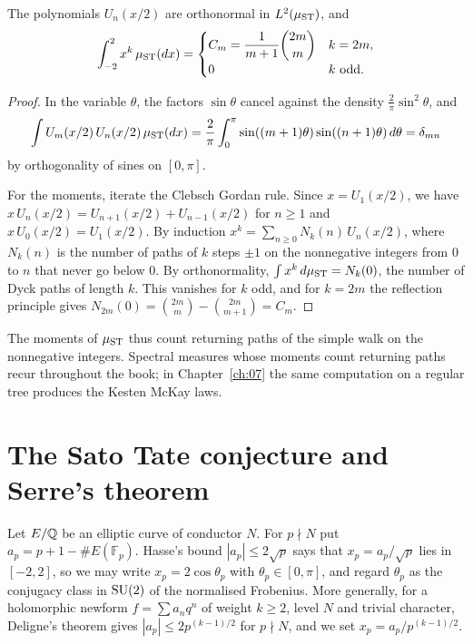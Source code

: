 \begin{proposition}\label{prop:04catalan}
The polynomials $U_n(x/2)$ are orthonormal in $L^2(\mu_{\mathrm{ST}})$, and
\[
\int_{-2}^2 x^{k}\,\mu_{\mathrm{ST}}(dx) = \begin{cases} C_m = \dfrac{1}{m+1}\dbinom{2m}{m} & k = 2m,\\[4pt] 0 & k \text{ odd.}\end{cases}
\]
\end{proposition}

\begin{proof}
In the variable $\theta$, the factors $\sin\theta$ cancel against the density $\frac{2}{\pi}\sin^2\theta$, and
\[
\int U_m(x/2)\,U_n(x/2)\,\mu_{\mathrm{ST}}(dx) = \frac{2}{\pi}\int_0^\pi \sin((m+1)\theta)\sin((n+1)\theta)\,d\theta = \delta_{mn}
\]
by orthogonality of sines on $[0,\pi]$.

For the moments, iterate the Clebsch Gordan rule. Since $x = U_1(x/2)$, we have $x\,U_n(x/2) = U_{n+1}(x/2) + U_{n-1}(x/2)$ for $n \ge 1$ and $x\,U_0(x/2) = U_1(x/2)$. By induction $x^k = \sum_{n\ge0} N_k(n)\,U_n(x/2)$, where $N_k(n)$ is the number of paths of $k$ steps $\pm1$ on the nonnegative integers from $0$ to $n$ that never go below $0$. By orthonormality, $\int x^k\,d\mu_{\mathrm{ST}} = N_k(0)$, the number of Dyck paths of length $k$. This vanishes for $k$ odd, and for $k = 2m$ the reflection principle gives $N_{2m}(0) = \binom{2m}{m} - \binom{2m}{m+1} = C_m$.
\end{proof}

The moments of $\mu_{\mathrm{ST}}$ thus count returning paths of the simple walk on the nonnegative integers. Spectral measures whose moments count returning paths recur throughout the book; in Chapter~\ref{ch:07} the same computation on a regular tree produces the Kesten McKay laws.

\section{The Sato Tate conjecture and Serre's theorem}

Let $E/\mathbb{Q}$ be an elliptic curve of conductor $N$. For $p \nmid N$ put $a_p = p + 1 - \#E(\mathbb{F}_p)$. Hasse's bound $|a_p| \le 2\sqrt p$ says that $x_p = a_p/\sqrt p$ lies in $[-2,2]$, so we may write $x_p = 2\cos\theta_p$ with $\theta_p \in [0,\pi]$, and regard $\theta_p$ as the conjugacy class in $\mathrm{SU}(2)$ of the normalised Frobenius. More generally, for a holomorphic newform $f = \sum a_n q^n$ of weight $k \ge 2$, level $N$ and trivial character, Deligne's theorem \cite{deligne1974} gives $|a_p| \le 2p^{(k-1)/2}$ for $p \nmid N$, and we set $x_p = a_p/p^{(k-1)/2}$.

